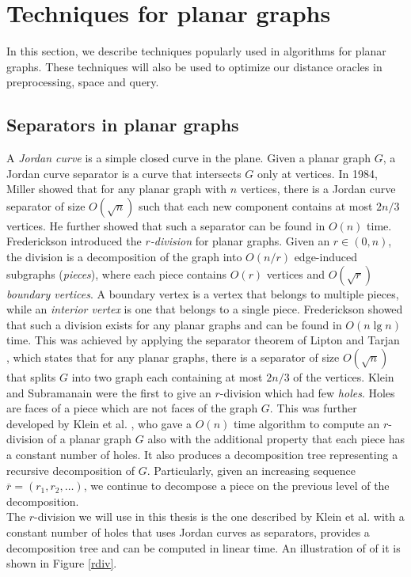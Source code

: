 \section{Techniques for planar graphs}\label{techniques}
In this section, we describe techniques popularly used in algorithms for planar graphs.
These techniques will also be used to optimize our distance oracles in preprocessing, space and
query.

\subsection{Separators in planar graphs}
A \textit{Jordan curve} is a simple closed curve in the plane. Given a planar graph $G$,
a Jordan curve separator is a curve that intersects $G$ only at vertices. In 1984, Miller
\cite{miller1984finding} showed that for any planar graph with $n$ vertices, there is a Jordan curve
separator of size $O(\sqrt{n})$ such that each new component contains at most $2n/3$
vertices. He further showed that such a separator can be found in $O(n)$ time. \\
Frederickson \cite{frederickson1987fast} introduced the \textit{$r$-division} for planar
graphs. Given an $r\in (0,n)$, the division is a decomposition of the graph into
$O(n/r)$ edge-induced subgraphs (\textit{pieces}), where each piece contains $O(r)$ vertices and $O(\sqrt{r})$ \textit{boundary vertices}. A
boundary vertex is a vertex that belongs to multiple pieces, while an \textit{interior
vertex} is one that belongs to a single piece. Frederickson showed that
such a division exists for any planar graphs and can be found in $O(n\lg n)$ time. This
was achieved by applying the separator theorem of Lipton and Tarjan
\cite{lipton1979separator}, which states that for any planar graphs, there is a separator
of size $O(\sqrt{n})$ that splits $G$ into two graph each containing at most $2n/3$ of
the vertices. Klein and Subramanain \cite{klein1998fully} were the first to give an
$r$-division which had few \textit{holes}. Holes are faces of a piece which are not faces
of the graph $G$. This was further developed
by Klein et al. \cite{klein2013structured}, who gave a $O(n)$ time algorithm to compute
an $r$-division of a planar graph $G$ also with the additional property that each piece has a
constant number of holes. It also produces a decomposition tree representing a recursive
decomposition of $G$. Particularly, given an increasing sequence $\overline{r}=(r_1,r_2,\dots)$, we
continue to decompose a piece on the previous level of the decomposition.
\\
The $r$-division we will use in this thesis is the one described by Klein et al.
\cite{klein2013structured} with a constant number of
holes that uses Jordan curves as separators, provides a decomposition tree and can be computed in linear time. An
illustration of of it is shown in Figure \ref{rdiv}.


